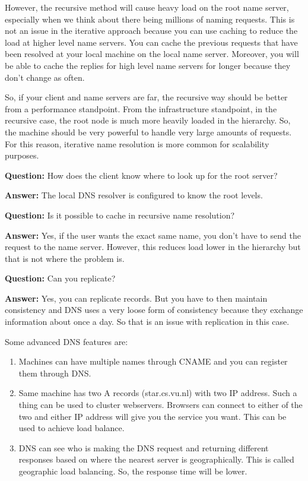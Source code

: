 \documentclass[twoside]{article}
\begin{document}
However, the recursive method will cause heavy load on the root name server, especially when we think about there being millions of naming requests. This is not an issue in the iterative approach because you can use caching to reduce the load at higher level name servers. You can cache the previous requests that have been resolved at your local machine on the local name server. Moreover, you will be able to cache the replies for high level name servers for longer because they don't change as often. 

So, if your client and name servers are far, the recursive way should be better from a performance standpoint. From the infrastructure standpoint, in the recursive case, the root node is much more heavily loaded in the hierarchy. So, the machine should be very powerful to handle very large amounts of requests. For this reason, iterative name resolution is more common for scalability purposes.

\textbf{Question: } How does the client know where to look up for the root server?

\textbf{Answer: } The local DNS resolver is configured to know the root levels. 

\textbf{Question: } Is it possible to cache in recursive name resolution?

\textbf{Answer: } Yes, if the user wants the exact same name, you don't have to send the request to the name server. However, this reduces load lower in the hierarchy but that is not where the problem is.

\textbf{Question: } Can you replicate?

\textbf{Answer: } Yes, you can replicate records. But you have to then maintain consistency and DNS uses a very loose form of consistency because they exchange information about once a day. So that is an issue with replication in this case. 

Some advanced DNS features are:

\begin{enumerate}
    \item Machines can have multiple names through CNAME and you can register them through DNS.
    \item Same machine has two A records (star.cs.vu.nl) with two IP address. Such a thing can be used to cluster webservers. Browsers can connect to either of the two and either IP address will give you the service you want. This can be used to achieve load balance. 
    \item DNS can see who is making the DNS request and returning different responses based on where the nearest server is geographically. This is called geographic load balancing. So, the response time will be lower.
\end{enumerate}
\end{document}
